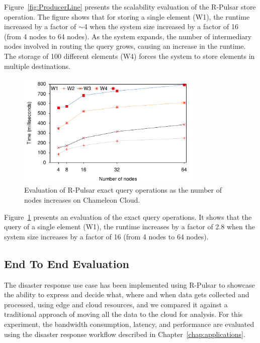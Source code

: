 Figure~\ref{fig:ProducerLine} presents the scalability evaluation of the R-Pulsar store operation. The figure shows that for storing a single element (W1), the runtime increased by a factor of $\sim$4 when the system size increased by a factor of 16 (from 4 nodes to 64 nodes). As the system expands, the number of intermediary nodes involved in routing the query grows, causing an increase in the runtime. The storage of 100 different elements (W4) forces the system to store elements in multiple destinations. %

\begin{figure}[h!]
  \includegraphics[width=0.8\textwidth]{Results/ProducerLineEx.pdf}
  \caption{Evaluation of R-Pulsar exact query operations as the number of nodes increases on Chameleon Cloud.}
  \label{fig:ProducerLineEx}
\end{figure}

Figure~\ref{fig:ProducerLineEx} presents an evaluation of the exact query operations. It shows that the query of a single element (W1), the runtime increases by a factor of 2.8 when the system size increases by a factor of 16 (from 4 nodes to 64 nodes).

\subsection{End To End Evaluation}

The disaster response use case has been implemented using R-Pulsar to showcase the ability to express and decide what, where and when data gets collected and processed, using edge and cloud resources, and we compared it against a traditional approach of moving all the data to the cloud for analysis.
For this experiment, the bandwidth consumption, latency, and performance are evaluated using the disaster response workflow described in Chapter~\ref{chap:applications}.

